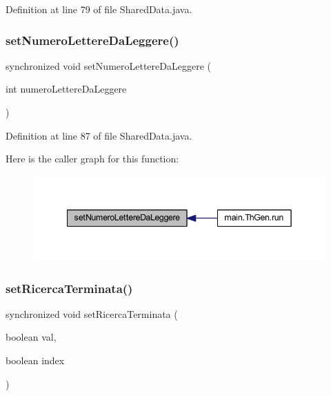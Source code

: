 Definition at line 79 of file Shared\+Data.\+java.

\mbox{\label{classmain_1_1_shared_data_aac2fca4598933f3179d78fe7857aed55}} 
\subsubsection{\texorpdfstring{set\+Numero\+Lettere\+Da\+Leggere()}{setNumeroLettereDaLeggere()}}
{\footnotesize\ttfamily synchronized void set\+Numero\+Lettere\+Da\+Leggere (\begin{DoxyParamCaption}\item[{int}]{numero\+Lettere\+Da\+Leggere }\end{DoxyParamCaption})}



Definition at line 87 of file Shared\+Data.\+java.

Here is the caller graph for this function\+:
\nopagebreak
\begin{figure}[H]
\begin{center}
\leavevmode
\includegraphics[width=342pt]{classmain_1_1_shared_data_aac2fca4598933f3179d78fe7857aed55_icgraph}
\end{center}
\end{figure}
\mbox{\label{classmain_1_1_shared_data_a8fb1402b905776d228577eee7cdb826f}} 
\subsubsection{\texorpdfstring{set\+Ricerca\+Terminata()}{setRicercaTerminata()}}
{\footnotesize\ttfamily synchronized void set\+Ricerca\+Terminata (\begin{DoxyParamCaption}\item[{boolean}]{val,  }\item[{boolean}]{index }\end{DoxyParamCaption})}



